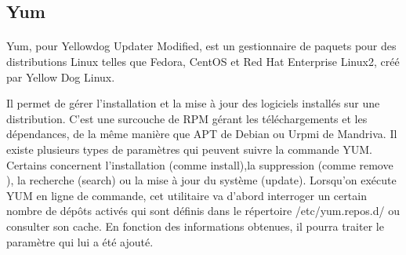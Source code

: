 \documentclass[a4paper,10pt]{article}
\begin{document}
\subsection{Yum}
\paragraph{}
Yum, pour Yellowdog Updater Modified, est un gestionnaire de paquets pour des distributions Linux telles que Fedora, CentOS et Red Hat Enterprise Linux2, créé par Yellow Dog Linux.

Il permet de gérer l'installation et la mise à jour des logiciels installés sur une distribution. C'est une surcouche de RPM gérant les téléchargements et les dépendances, de la même manière que APT de Debian ou Urpmi de Mandriva.
Il existe plusieurs types de paramètres qui peuvent suivre la commande YUM. Certains concernent l'installation (comme install),la suppression (comme remove ), la recherche (search) ou la mise à jour du système (update). Lorsqu'on exécute YUM 
en ligne de commande, cet utilitaire va d'abord interroger un certain nombre de dépôts activés qui sont définis dans le répertoire /etc/yum.repos.d/ ou consulter son cache. En fonction des informations obtenues, il pourra traiter le paramètre qui lui a été ajouté.
\end{document}
